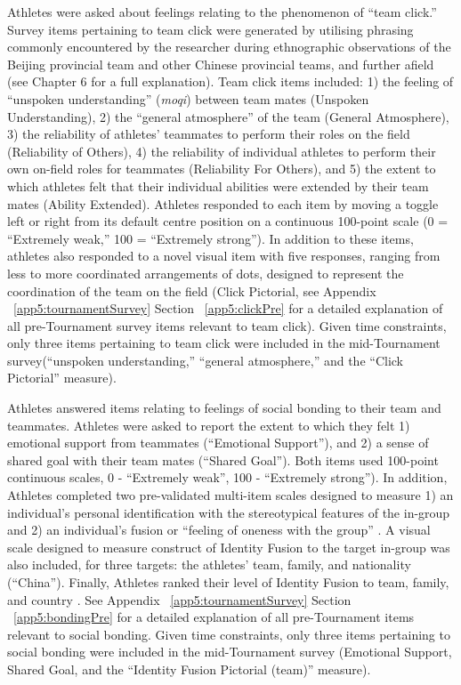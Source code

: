 Athletes were asked about feelings relating to the phenomenon of ``team click.'' Survey items pertaining to team click were generated by utilising phrasing commonly encountered by the researcher during ethnographic observations of the Beijing provincial team and other Chinese provincial teams, and further afield (see Chapter 6 for a full explanation).  Team click items included: 1) the feeling of ``unspoken understanding'' (\textit{moqi}) between team mates (Unspoken Understanding), 2) the ``general atmosphere'' of the team (General Atmosphere), 3) the reliability of athletes' teammates to perform their roles on the field (Reliability of Others), 4) the reliability of individual athletes to perform their own on-field roles for teammates (Reliability For Others), and 5) the extent to which athletes felt that their individual abilities were extended by their team mates (Ability Extended).  Athletes responded to each item by moving a toggle left or right from its default centre position on a continuous 100-point scale (0 = ``Extremely weak,'' 100 = ``Extremely strong''). In addition to these items, athletes also responded to a novel visual item with five responses, ranging from less to more coordinated arrangements of dots, designed to represent the coordination of the team on the field (Click Pictorial, see Appendix ~\ref{app5:tournamentSurvey} Section ~\ref{app5:clickPre} for a detailed explanation of all pre-Tournament survey items relevant to team click).  Given time constraints, only three items pertaining to team click were included in the mid-Tournament survey(``unspoken understanding,'' ``general atmosphere,'' and the ``Click Pictorial'' measure).

Athletes answered items relating to feelings of social bonding to their team and teammates.  Athletes were asked to report the extent to which they felt 1) emotional support from teammates (``Emotional Support''), and 2) a sense of shared goal with their team mates (``Shared Goal''). Both items used 100-point continuous scales, 0 - ``Extremely weak'', 100 - ``Extremely strong'').  In addition, Athletes completed two pre-validated multi-item scales designed to measure 1) an individual's personal identification with the stereotypical features of the in-group \citep[Group Identification Verbal Scale, see][]{Mael1992} and 2) an individual's fusion or ``feeling of oneness with the group'' \citep[Identity Fusion Verbal Scale, see][]{Swann2009}.
A visual scale designed to measure construct of Identity Fusion to the target in-group \citep[Identity Fusion Pictorial][]{Swann2009} was also included, for three targets: the athletes' team, family, and nationality (``China'').  Finally,  Athletes ranked their level of Identity Fusion to team, family, and country \citep[Identity Fusion Pictorial Rank, replicating][]{Whitehouse2014}.  See Appendix ~\ref{app5:tournamentSurvey} Section ~\ref{app5:bondingPre} for a detailed explanation of all pre-Tournament items relevant to social bonding.  Given time constraints, only three items pertaining to social bonding were included in the mid-Tournament survey (Emotional Support, Shared Goal, and the ``Identity Fusion Pictorial (team)'' measure).

